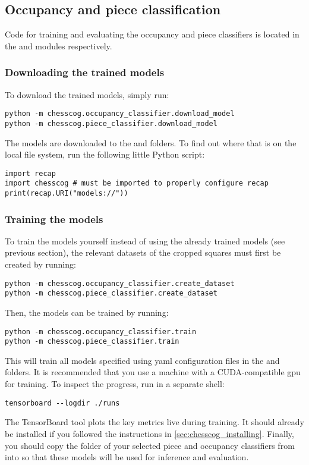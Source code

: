 \documentclass[../../report.tex]{subfiles}
\begin{document}
\subsection{Occupancy and piece classification}
Code for training and evaluating the occupancy and piece classifiers is located in the  and  modules respectively.
\subsubsection{Downloading the trained models}
To download the trained models, simply run:
\begin{verbatim}
python -m chesscog.occupancy_classifier.download_model
python -m chesscog.piece_classifier.download_model
\end{verbatim}
The models are downloaded to the  and  folders.
To find out where that is on the local file system, run the following little Python script:
\begin{verbatim}
import recap
import chesscog # must be imported to properly configure recap
print(recap.URI("models://"))
\end{verbatim}
\subsubsection{Training the models}
To train the models yourself instead of using the already trained models (see previous section), the relevant datasets of the cropped squares must first be created by running:
\begin{verbatim}
python -m chesscog.occupancy_classifier.create_dataset
python -m chesscog.piece_classifier.create_dataset
\end{verbatim}
Then, the models can be trained by running:
\begin{verbatim}
python -m chesscog.occupancy_classifier.train
python -m chesscog.piece_classifier.train
\end{verbatim}
This will train all models specified using \gls{yaml} configuration files in the  and  folders.
It is recommended that you use a machine with a CUDA-compatible \gls{gpu} for training.
To inspect the progress, run in a separate shell:
\begin{verbatim}
tensorboard --logdir ./runs
\end{verbatim}
The TensorBoard tool plots the key metrics live during training.
It should already be installed if you followed the instructions in \cref{sec:chesscog_installing}.
Finally, you should copy the folder of your selected piece and occupancy classifiers from  into  so that these models will be used for inference and evaluation.
\end{document}
